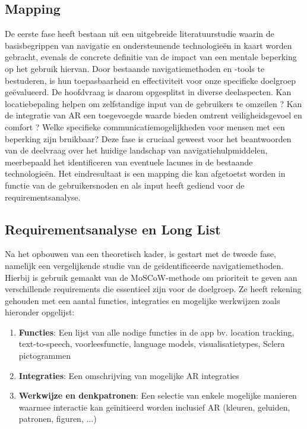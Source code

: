 \subsection*{Mapping}
De eerste fase heeft bestaan uit een uitgebreide literatuurstudie waarin de basisbegrippen van navigatie en ondersteunende technologieën in kaart worden gebracht, evenals de concrete definitie van de impact van een mentale beperking op het gebruik hiervan.  Door bestaande navigatiemethoden en -tools te bestuderen, is hun toepasbaarheid en effectiviteit voor onze specifieke doelgroep geëvalueerd. De hoofdvraag is daarom opgesplitst in diverse deelaspecten. Kan locatiebepaling helpen om zelfstandige input van de gebruikers te omzeilen ? Kan de integratie van AR een toegevoegde waarde bieden omtrent veiligheidsgevoel en comfort ? Welke specifieke communicatiemogelijkheden voor mensen met een beperking zijn bruikbaar? Deze fase is cruciaal geweest voor het beantwoorden van de deelvraag over het huidige landschap van navigatiehulpmiddelen, meerbepaald het identificeren van eventuele lacunes in de bestaande technologieën. Het eindresultaat is een mapping die kan afgetoetst worden in functie van de gebruikersnoden en als input heeft gediend voor de requirementsanalyse.

\subsection*{Requirementsanalyse en Long List}

Na het opbouwen van een theoretisch kader, is gestart met de tweede fase, namelijk een vergelijkende studie van de geïdentificeerde navigatiemethoden. Hierbij is gebruik gemaakt van de MoSCoW-methode om prioriteit te geven aan verschillende requirements die essentieel zijn voor de doelgroep. Ze heeft rekening gehouden met een aantal functies, integraties en mogelijke werkwijzen zoals hieronder opgelijst:

\begin{enumerate}
    \item \textbf{Functies}: Een lijst van alle nodige functies in de app bv. location tracking, text-to-speech, voorleesfunctie, language models, visualisatietypes, Sclera pictogrammen
    \item \textbf{Integraties}: Een omschrijving van mogelijke AR integraties
    \item \textbf{Werkwijze en denkpatronen}: Een selectie van enkele mogelijke manieren waarmee interactie kan geïnitieerd worden inclusief AR (kleuren, geluiden, patronen, figuren, $\ldots$)
\end{enumerate}

